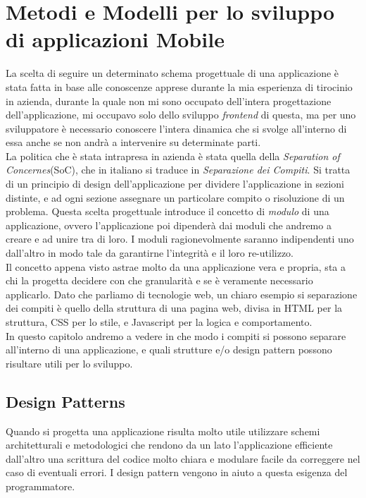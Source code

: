 \chapter{Metodi e Modelli per lo sviluppo di applicazioni Mobile}
La scelta di seguire un determinato schema progettuale di una applicazione è stata fatta in base alle conoscenze apprese durante la mia esperienza di tirocinio in azienda, durante la quale non mi sono occupato dell'intera progettazione dell'applicazione, mi occupavo solo dello sviluppo \emph{frontend} di questa, ma per uno sviluppatore è necessario conoscere l'intera dinamica che si svolge all'interno di essa anche se non andrà a intervenire su determinate parti.\\

La politica che è stata intrapresa in azienda è stata quella della \emph{Separation of Concernes}(SoC), che in italiano si traduce in \emph{Separazione dei Compiti}. Si tratta di un principio di design dell'applicazione per dividere l'applicazione in sezioni distinte, e ad ogni sezione assegnare un particolare compito o risoluzione di un problema. Questa scelta progettuale introduce il concetto di \emph{modulo} di una applicazione, ovvero l'applicazione poi dipenderà dai moduli che andremo a creare e ad unire tra di loro. I moduli ragionevolmente saranno indipendenti uno dall'altro in modo tale da garantirne l'integrità e il loro re-utilizzo.\cite{wiki:soc}\\
Il concetto appena visto astrae molto da una applicazione vera e propria, sta a chi la progetta decidere con che granularità  e se è veramente necessario applicarlo. Dato che parliamo di tecnologie web, un chiaro esempio si separazione dei compiti è quello della struttura di una pagina web, divisa in HTML per la struttura, CSS per lo stile, e Javascript per la logica e comportamento.\\

In questo capitolo andremo a vedere in che modo i compiti si possono separare all'interno di una applicazione, e quali strutture e/o design pattern possono risultare utili per lo sviluppo.
 
\section{Design Patterns}

Quando si progetta una applicazione risulta molto utile utilizzare schemi architetturali e metodologici che rendono da un lato l'applicazione efficiente dall'altro una scrittura del codice molto chiara e modulare facile da correggere nel caso di eventuali errori. I design pattern vengono in aiuto a questa esigenza del programmatore.

